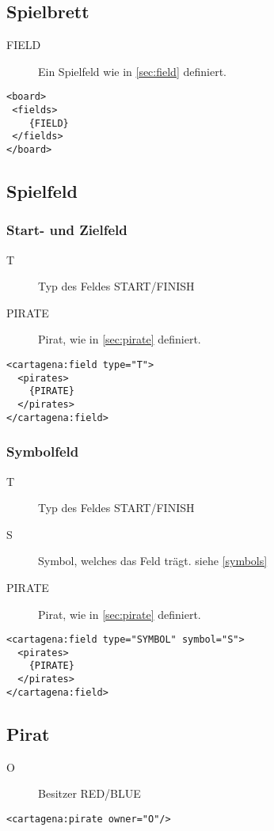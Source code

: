 \documentclass[12pt,a4paper, ngerman, oneside]{scrartcl}
\begin{document}
\subsection{\label{board}Spielbrett}
\begin{description}
\item[FIELD] Ein Spielfeld wie in \ref{sec:field} definiert.
\end{description}
\begin{verbatim}
<board>
 <fields>
 	{FIELD}
 </fields>
</board>
\end{verbatim}

\subsection{\label{sec:field}Spielfeld}
\subsubsection{\label{sec:startEndField} Start- und Zielfeld}
\begin{description}
\item[T] Typ des Feldes START/FINISH
\item[PIRATE] Pirat, wie in \ref{sec:pirate} definiert.
\end{description}
\begin{verbatim}
<cartagena:field type="T">
  <pirates>
  	{PIRATE}
  </pirates>
</cartagena:field>
\end{verbatim}

\subsubsection{\label{sec:symbolField} Symbolfeld}
\begin{description}
\item[T] Typ des Feldes START/FINISH
\item[S] Symbol, welches das Feld trägt. siehe \ref{symbols}
\item[PIRATE] Pirat, wie in \ref{sec:pirate} definiert.
\end{description}
\begin{verbatim}
<cartagena:field type="SYMBOL" symbol="S">
  <pirates>
  	{PIRATE}
  </pirates>
</cartagena:field>
\end{verbatim}

\subsection{\label{sec:pirate}Pirat}
\begin{description}
\item[O] Besitzer RED/BLUE
\end{description}
\begin{verbatim}
<cartagena:pirate owner="O"/>
\end{verbatim}
\end{document}
